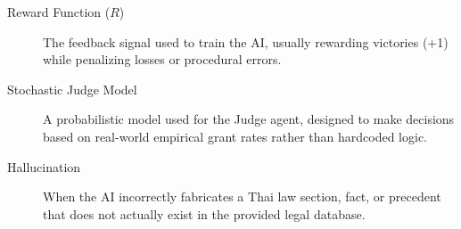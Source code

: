 \begin{description}
\item[Reward Function ($R$)] The feedback signal used to train the AI, usually rewarding victories (+1) while penalizing losses or procedural errors.

\item[Stochastic Judge Model] A probabilistic model used for the Judge agent, designed to make decisions based on real-world empirical grant rates rather than hardcoded logic.

\item[Hallucination] When the AI incorrectly fabricates a Thai law section, fact, or precedent that does not actually exist in the provided legal database.

\end{description}
